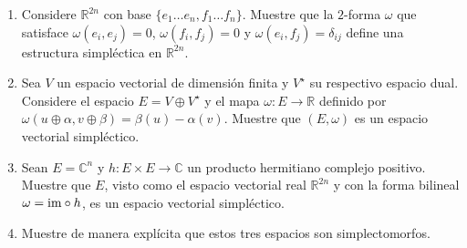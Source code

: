 \begin{problem}
\leavevmode
\begin{enumerate}
    \item Considere $\mathbb R^{2n}$ con base $\{ e_1 \dots e_n, f_1 \dots f_n \}$. Muestre que la $2$-forma $\omega$ que satisface $\omega(e_i, e_j) = 0$, $\omega(f_i, f_j) = 0$ y $\omega(e_i, f_j) = \delta_{ij}$ define una estructura simpléctica en $\mathbb R^{2n}$.
    
    \item Sea $V$ un espacio vectorial de dimensión finita y $V^\star$ su respectivo espacio dual. Considere el espacio $E = V \oplus V^\star$ y el mapa $\omega : E \to \mathbb R$ definido por $\omega(u \oplus \alpha, v \oplus \beta) = \beta(u) - \alpha(v)$. Muestre que $(E, \omega)$ es un espacio vectorial simpléctico.
    
    \item Sean $E = \mathbb C^n$ y $h : E \times E \to \mathbb C$ un producto hermitiano complejo positivo. Muestre que $E$, visto como el espacio vectorial real $\mathbb R^{2n}$ y con la forma bilineal $\omega = {\operatorname{im}} \circ h$, es un espacio vectorial simpléctico.
    
    \item Muestre de manera explícita que estos tres espacios son simplectomorfos.
\end{enumerate}
\end{problem}

